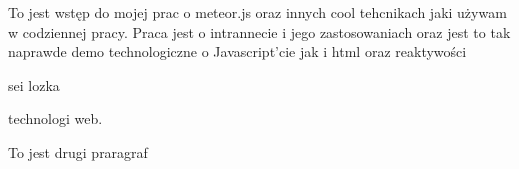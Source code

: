 To jest wstęp do mojej prac o meteor.js oraz innych cool tehcnikach jaki używam
w codziennej pracy. Praca jest o intrannecie i jego zastosowaniach oraz jest to
tak naprawde demo technologiczne o Javascript'cie jak i html oraz reaktywości

sei lozka

technologi web.

To jest drugi praragraf

